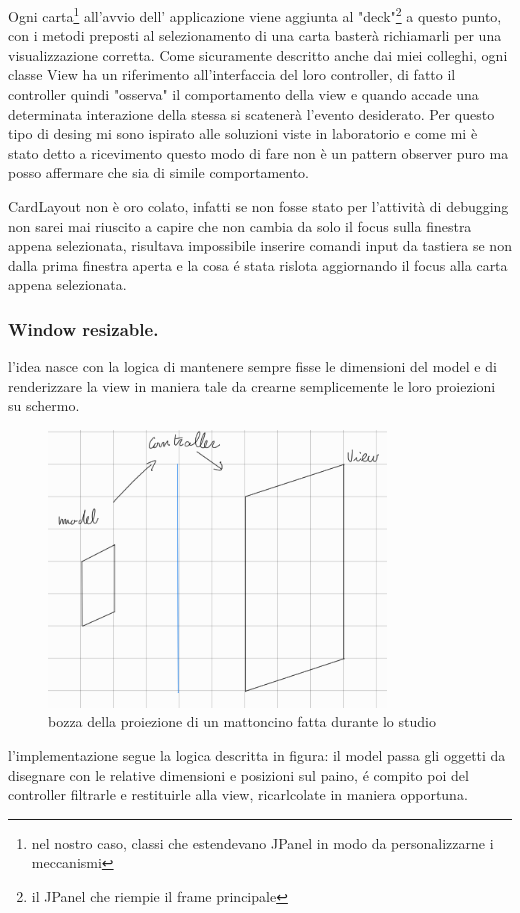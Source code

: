 \documentclass[a4paper,12pt]{report}
\begin{document}
Ogni carta\footnote{nel nostro caso, classi che estendevano JPanel in modo da personalizzarne i meccanismi}
all'avvio dell' applicazione viene aggiunta al "deck"\footnote{il JPanel che riempie il frame principale}
a questo punto, con i metodi preposti al selezionamento di una carta basterà richiamarli per una visualizzazione
corretta.
Come sicuramente descritto anche dai miei colleghi, ogni classe View ha un riferimento all'interfaccia
del loro controller, di fatto il controller quindi "osserva" il comportamento della view e quando accade una
determinata interazione della stessa si scatenerà l'evento desiderato.
Per questo tipo di desing mi sono ispirato alle soluzioni viste in laboratorio e come mi è stato detto
a ricevimento questo modo di fare non è un pattern observer puro ma posso affermare che sia di simile
comportamento.

CardLayout non è oro colato, infatti se non fosse stato per l'attività di debugging non sarei mai riuscito
a capire che non cambia da solo il focus sulla finestra appena selezionata, risultava impossibile
inserire comandi input da tastiera se non dalla prima finestra aperta e la cosa é stata rislota
aggiornando il focus alla carta appena selezionata.\\

\subsubsection{Window resizable.}

l'idea nasce con la logica di mantenere sempre fisse le dimensioni del model
e di renderizzare la view in maniera tale da crearne semplicemente le loro proiezioni su schermo.
\begin{figure}[H]
    \centering
    \includegraphics[width=0.8\textwidth]{images/resizableConcept.png}
    \caption{bozza della proiezione di un mattoncino fatta durante lo studio}
\end{figure}
l'implementazione segue la logica descritta in figura: il model passa gli oggetti da disegnare con le
relative dimensioni e posizioni sul paino, é compito poi del controller filtrarle e restituirle alla view,
ricarlcolate in maniera opportuna.\\
\end{document}
